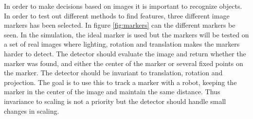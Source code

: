 In order to make decisions based on images it is important to recognize objects.
In order to test out different methods to find features, three different image markers has been selected.
In figure \ref{fig:markers} can the different markers be seen.
In the simulation, the ideal marker is used but the markers will be tested on a set of real images where lighting, rotation and translation makes the markers harder to detect.
The detector should evaluate the image and return whether the marker was found, and either the center of the marker or several fixed points on the marker.
The detector should be invariant to translation, rotation and projection.
The goal is to use this to track a marker with a robot, keeping the marker in the center of the image and maintain the same distance.
Thus invariance to scaling is not a priority but the detector should handle small changes in scaling.

